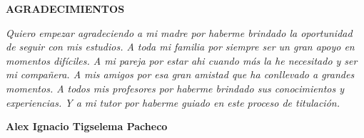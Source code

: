 \newpage
\vspace*{\fill}
\begin{flushright}
	\footnotesize
	\begin{minipage}{0.5\textwidth}
		\begin{flushright}
			\uppercase{\textbf{Agradecimientos}}
		\end{flushright}
		\itshape
		Quiero empezar agradeciendo a mi madre por haberme brindado la oportunidad de seguir con mis estudios.
		A toda mi familia por siempre ser un gran apoyo en momentos difíciles.
		A mi pareja por estar ahi cuando más la he necesitado y ser mi compañera.
		A mis amigos por esa gran amistad que ha conllevado a grandes momentos.
		A todos mis profesores por haberme brindado sus conocimientos y experiencias.
		Y a mi tutor por haberme guiado en este proceso de titulación.

		\bigbreak
		\begin{flushright}
			\textbf{Alex Ignacio Tigselema Pacheco}
		\end{flushright}
	\end{minipage}
\end{flushright}
\vspace*{\fill}
